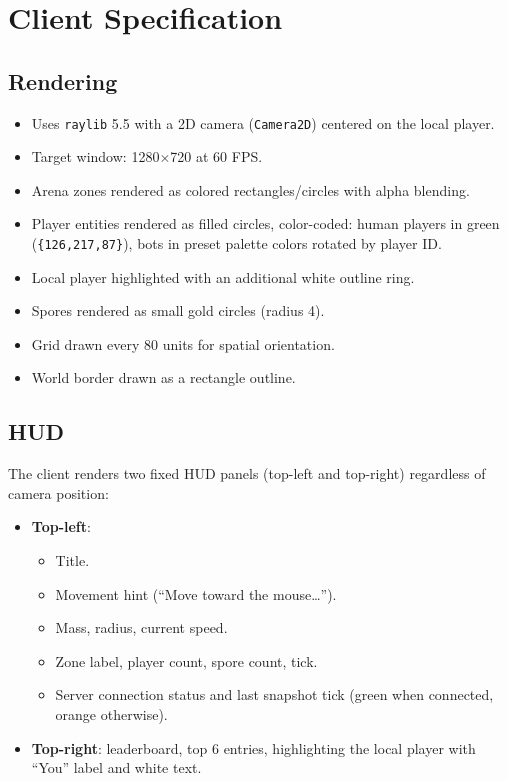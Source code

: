 \documentclass[11pt]{article}
\begin{document}
\section{Client Specification}

\subsection{Rendering}

\begin{itemize}
  \item Uses \texttt{raylib} 5.5 with a 2D camera (\texttt{Camera2D}) centered on the local player.
  \item Target window: 1280$\times$720 at 60 FPS.
  \item Arena zones rendered as colored rectangles/circles with alpha blending.
  \item Player entities rendered as filled circles, color-coded: human players in green (\texttt{\{126,217,87\}}), bots in preset palette colors rotated by player ID.
  \item Local player highlighted with an additional white outline ring.
  \item Spores rendered as small gold circles (radius 4).
  \item Grid drawn every 80 units for spatial orientation.
  \item World border drawn as a rectangle outline.
\end{itemize}

\subsection{HUD}

The client renders two fixed HUD panels (top-left and top-right) regardless of camera position:

\begin{itemize}
  \item \textbf{Top-left}:
    \begin{itemize}
      \item Title.
      \item Movement hint (``Move toward the mouse\ldots'').
      \item Mass, radius, current speed.
      \item Zone label, player count, spore count, tick.
      \item Server connection status and last snapshot tick (green when connected, orange otherwise).
    \end{itemize}
  \item \textbf{Top-right}: leaderboard, top 6 entries, highlighting the local player with ``You'' label and white text.
\end{itemize}
\end{document}
